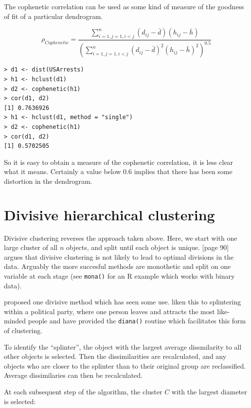 The cophenetic correlation can be used as some kind of measure of the goodness of fit of a particular dendrogram.

\begin{equation}
\rho_{Cophenetic} = \frac{\sum_{i=1, j=1, i <j}^{n} (d_{ij} - \bar{d})(h_{ij} - \bar{h})}{
\left(\sum_{i=1, j=1, i <j}^{n} (d_{ij} - \bar{d})^{2}(h_{ij} - \bar{h})^{2} \right)^{0.5}}
\end{equation}

\singlespacing
\begin{verbatim}
> d1 <- dist(USArrests)
> h1 <- hclust(d1)
> d2 <- cophenetic(h1)
> cor(d1, d2)
[1] 0.7636926
> h1 <- hclust(d1, method = "single")
> d2 <- cophenetic(h1)
> cor(d1, d2)
[1] 0.5702505
\end{verbatim}
\onehalfspacing

So it is easy to obtain a measure of the cophenetic correlation, it is less clear what it means.   Certainly a value below 0.6 implies that there has been some distortion in the dendrogram.

\section{Divisive hierarchical clustering}
\label{aggclust}

Divisive clustering reverses the approach taken above.   Here, we start with one large cluster of all $n$ objects, and split until each object is unique. 
[page 90] \cite{Gordon:1999} argues that divisive clustering is not likely to lead to optimal divisions in the data.   Arguably the more succesful methods are monothetic and split on one variable at each stage (see \verb+mona()+ for an R example which works with binary data).      

\cite{MacNaughton-Smith+etal:1964} proposed one divisive method which has seen some use.   \cite{Kaufman+Rousseeuw:1989} liken this to splintering within a political party, where one person leaves and attracts the most like-minded people and have provided the \verb+diana()+ routine which facilitates this form of clustering.   


To identify the ``splinter'', the object with the largest average dissmilarity to all other objects is selected.   Then the dissimilarities are recalculated, and any objects who are closer to the splinter than to their original group are reclassified.   Average dissimilaries can then be recalculated.


At each subsequent step of the algorithm, the cluster $C$ with the largest diameter is selected:

